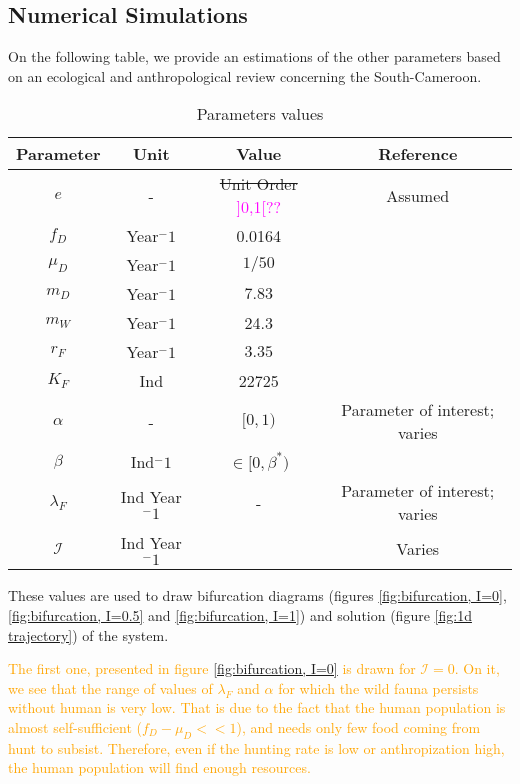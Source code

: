 \documentclass{article}
\newcommand{\lfw}{\lambda_{F}}
\newcommand{\lfw}{\lambda_{F}}
\newcommand{\cI}{\mathcal{I}}
\newcommand{\YD}[1]{\textcolor{magenta}{#1}}
\newcommand{\vdeux}[1]{\textcolor{orange}{#1}}
\theoremstyle{definition}
\theoremstyle{remark}
\begin{document}
\subsection{Numerical Simulations}
On the following table, we provide an estimations of the other parameters based on an ecological and anthropological review concerning the South-Cameroon.

\begin{table}[ht]
\centering
\begin{tabular}{|c|c|c|c|}
\hline 
Parameter & Unit & Value & Reference \\ 
\hline 
$e$ & - &\sout{Unit Order} \YD{]0,1[??} & Assumed\\
$f_D$ & Year$^-1$ &0.0164 & \cite{koppert_consommation_1996}\\
$\mu_D$ & Year$^-1$  & $1/50$ & \cite{ins_demographie}\\
$m_D$ & Year$^-1$  &$7.83$ & \cite{avila_interpreting_2019}\\
$m_W$ &Year$^-1$  &24.3 & \cite{avila_interpreting_2019}\\
$r_F$ & Year$^-1$ & $3.35$ & \cite{robinson_intrinsic_1986}\\
$K_F$ & Ind& 22725 & \cite{janson_ecological_1990} \\
$\alpha$ &-&  $[0, 1)$ & Parameter of interest; varies \\
$\beta$ & Ind$^-1$ & $\in [0, \beta^*)$ &  \\
$\lfw$ & Ind Year$^-1$ & - & Parameter of interest; varies \\
$\mathcal{I}$ &  Ind Year$^-1$ & & Varies \\
\hline
\end{tabular}
\caption{Parameters values}
\label{table:param values}
\end{table}

These values are used to draw bifurcation diagrams (figures \ref{fig:bifurcation, I=0}, \ref{fig:bifurcation, I=0.5} and \ref{fig:bifurcation, I=1}) and solution (figure \ref{fig:1d trajectory}) of the system.

\vdeux{
The first one, presented in figure \ref{fig:bifurcation, I=0} is drawn for $\cI = 0$. On it, we see that the range of values of $\lfw$ and $\alpha$ for which the wild fauna persists without human is very low. That is due to the fact that the human population is almost self-sufficient ($f_D - \mu_D << 1$), and needs only few food coming from hunt to subsist. Therefore, even if the hunting rate is low or anthropization high, the human population will find enough resources. 
}
\end{document}
